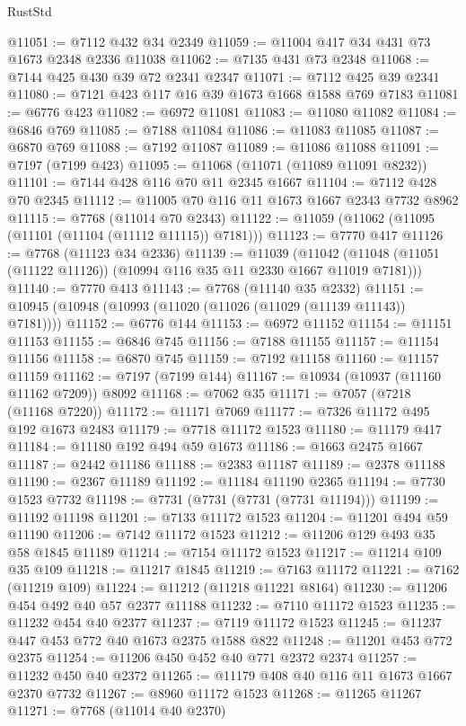 \begin{lexlean}{RustStd}
\begin{coremodule}
@11051 := @7112 @432 @34 @2349
@11059 := @11004 @417 @34 @431 @73 @1673 @2348 @2336 @11038
@11062 := @7135 @431 @73 @2348
@11068 := @7144 @425 @430 @39 @72 @2341 @2347
@11071 := @7112 @425 @39 @2341
@11080 := @7121 @423 @117 @16 @39 @1673 @1668 @1588 @769 @7183
@11081 := @6776 @423
@11082 := @6972 @11081
@11083 := @11080 @11082
@11084 := @6846 @769
@11085 := @7188 @11084
@11086 := @11083 @11085
@11087 := @6870 @769
@11088 := @7192 @11087
@11089 := @11086 @11088
@11091 := @7197 (@7199 @423)
@11095 := @11068 (@11071 (@11089 @11091 @8232))
@11101 := @7144 @428 @116 @70 @11 @2345 @1667
@11104 := @7112 @428 @70 @2345
@11112 := @11005 @70 @116 @11 @1673 @1667 @2343 @7732 @8962
@11115 := @7768 (@11014 @70 @2343)
@11122 := @11059 (@11062 (@11095 (@11101 (@11104 (@11112 @11115)) @7181)))
@11123 := @7770 @417
@11126 := @7768 (@11123 @34 @2336)
@11139 := @11039
    (@11042 (@11048 (@11051 (@11122 @11126)) (@10994 @116 @35 @11 @2330 @1667 @11019 @7181)))
@11140 := @7770 @413
@11143 := @7768 (@11140 @35 @2332)
@11151 := @10945 (@10948 (@10993 (@11020 (@11026 (@11029 (@11139 @11143)) @7181))))
@11152 := @6776 @144
@11153 := @6972 @11152
@11154 := @11151 @11153
@11155 := @6846 @745
@11156 := @7188 @11155
@11157 := @11154 @11156
@11158 := @6870 @745
@11159 := @7192 @11158
@11160 := @11157 @11159
@11162 := @7197 (@7199 @144)
@11167 := @10934 (@10937 (@11160 @11162 @7209)) @8092
@11168 := @7062 @35
@11171 := @7057 (@7218 (@11168 @7220))
@11172 := @11171 @7069
@11177 := @7326 @11172 @495 @192 @1673 @2483
@11179 := @7718 @11172 @1523
@11180 := @11179 @417
@11184 := @11180 @192 @494 @59 @1673
@11186 := @1663 @2475 @1667
@11187 := @2442 @11186
@11188 := @2383 @11187
@11189 := @2378 @11188
@11190 := @2367 @11189
@11192 := @11184 @11190 @2365
@11194 := @7730 @1523 @7732
@11198 := @7731 (@7731 (@7731 (@7731 @11194)))
@11199 := @11192 @11198
@11201 := @7133 @11172 @1523
@11204 := @11201 @494 @59 @11190
@11206 := @7142 @11172 @1523
@11212 := @11206 @129 @493 @35 @58 @1845 @11189
@11214 := @7154 @11172 @1523
@11217 := @11214 @109 @35 @109
@11218 := @11217 @1845
@11219 := @7163 @11172
@11221 := @7162 (@11219 @109)
@11224 := @11212 (@11218 @11221 @8164)
@11230 := @11206 @454 @492 @40 @57 @2377 @11188
@11232 := @7110 @11172 @1523
@11235 := @11232 @454 @40 @2377
@11237 := @7119 @11172 @1523
@11245 := @11237 @447 @453 @772 @40 @1673 @2375 @1588 @822
@11248 := @11201 @453 @772 @2375
@11254 := @11206 @450 @452 @40 @771 @2372 @2374
@11257 := @11232 @450 @40 @2372
@11265 := @11179 @408 @40 @116 @11 @1673 @1667 @2370 @7732
@11267 := @8960 @11172 @1523
@11268 := @11265 @11267
@11271 := @7768 (@11014 @40 @2370)

\end{coremodule}
\end{lexlean}
